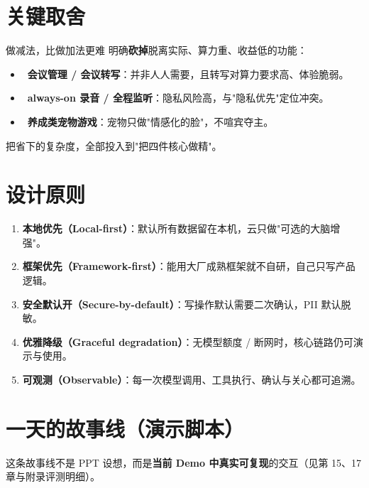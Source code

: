 \section{关键取舍}
\begin{goodbox}{做减法，比做加法更难}
明确\textbf{砍掉}脱离实际、算力重、收益低的功能：
\begin{itemize}[leftmargin=1.4em,topsep=2pt]
  \item \xmark\ \textbf{会议管理 / 会议转写}：并非人人需要，且转写对算力要求高、体验脆弱。
  \item \xmark\ \textbf{always-on 录音 / 全程监听}：隐私风险高，与"隐私优先"定位冲突。
  \item \xmark\ \textbf{养成类宠物游戏}：宠物只做"情感化的脸"，不喧宾夺主。
\end{itemize}
把省下的复杂度，全部投入到"把四件核心做精"。
\end{goodbox}

\section{设计原则}
\begin{enumerate}[leftmargin=1.6em]
  \item \textbf{本地优先（Local-first）}：默认所有数据留在本机，云只做"可选的大脑增强"。
  \item \textbf{框架优先（Framework-first）}：能用大厂成熟框架就不自研，自己只写产品逻辑。
  \item \textbf{安全默认开（Secure-by-default）}：写操作默认需要二次确认，PII 默认脱敏。
  \item \textbf{优雅降级（Graceful degradation）}：无模型额度 / 断网时，核心链路仍可演示与使用。
  \item \textbf{可观测（Observable）}：每一次模型调用、工具执行、确认与关心都可追溯。
\end{enumerate}

\section{一天的故事线（演示脚本）}
\begin{center}
\end{center}

\noindent 这条故事线不是 PPT 设想，而是\textbf{当前 Demo 中真实可复现}的交互（见第 15、17 章与附录评测明细）。
